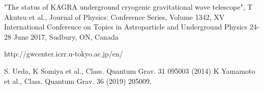 \begin{thebibliography}{9}
 "The status of KAGRA underground cryogenic gravitational wave telescope", T Akutsu et al., Journal of Physics: Conference Series, Volume 1342, XV International Conference on Topics in Astroparticle and Underground Physics 24-28 June 2017, Sudbury, ON, Canada



%
%
%



%
%
%




 http://gwcenter.icrr.u-tokyo.ac.jp/en/


 S. Ueda, K Somiya et al., Class. Quantum Grav. 31 095003 (2014)
 K Yamamoto et al., Class. Quantum Grav. 36 (2019) 205009.
\end{thebibliography}

